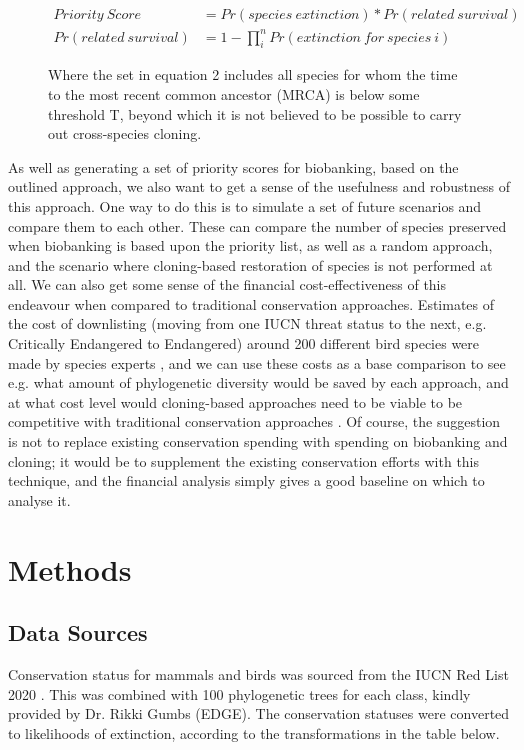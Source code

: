 \documentclass[10pt]{article}
\begin{document}
	\begin{figure}
	\begin{align}
			Priority\ Score &= Pr(species\ extinction) * Pr(related\ survival) \\
			Pr(related\ survival) &= 1 - \prod_{i}^{n}{Pr(extinction\ for\ species\ i)}
	\end{align}
	\caption{Where the set in equation 2 includes all species for whom the time to the most recent common ancestor (MRCA) is below some threshold T, beyond which it is
			not believed to be possible to carry out cross-species cloning.}
	\end{figure}
	
	As well as generating a set of priority scores for biobanking, based on the
	outlined approach, we also want to get a sense of the usefulness and
	robustness of this approach. One way to do this is to simulate a set of future
	scenarios and compare them to each other. These can compare the number of species
	preserved when biobanking is based upon the priority list, as well as a random
	approach, and the scenario where cloning-based restoration of species is not
	performed at all. We can also get some sense of the financial cost-effectiveness of
	this endeavour when compared to traditional conservation approaches. Estimates of the
	cost of downlisting (moving from one IUCN threat status to the next, e.g. Critically
	Endangered to Endangered) around 200 different bird species were made by
	species experts \cite{mccarthyFinancialCostsMeeting2012}, and we can use these costs as a base comparison to see e.g. what
	amount of phylogenetic diversity would be saved by each approach, and at what
	cost level would cloning-based approaches need to be viable to be competitive
	with traditional conservation approaches \cite{nunesPriceConservingAvian2015}. Of course, the suggestion is not to replace
	existing conservation spending with spending on biobanking and cloning; it would
	be to supplement the existing conservation efforts with this technique, and the
	financial analysis simply gives a good baseline on which to analyse it.

	
	
	
	\section{Methods}
	\subsection{Data Sources}
	Conservation status for mammals and birds was sourced from the IUCN Red List 2020 \cite{iucnIUCNRedList2021, IUCNRedList2012}. This was combined with 100 phylogenetic trees for each class, kindly provided by Dr. Rikki Gumbs (EDGE). The conservation statuses were converted to likelihoods of extinction, according to the transformations in the table below.
	
\end{document}

